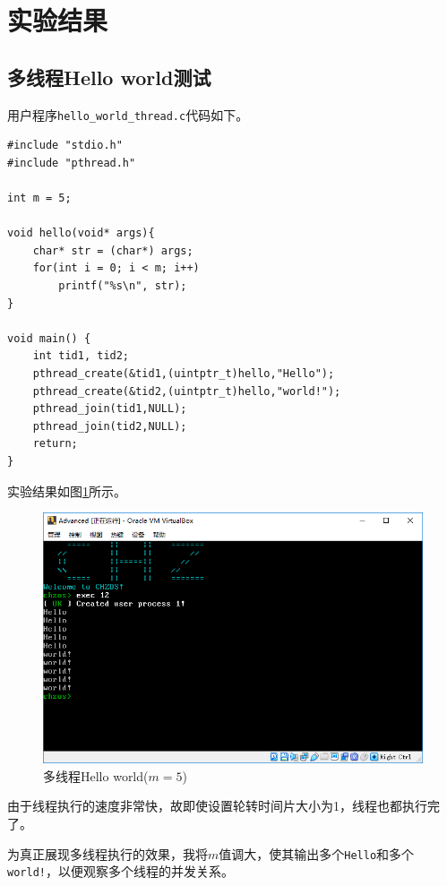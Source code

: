 \documentclass[logo,reportComp]{thesis}
\begin{document}
\section{实验结果}
\subsection{多线程Hello world测试}
用户程序\verb'hello_world_thread.c'代码如下。
\begin{lstlisting}
#include "stdio.h"
#include "pthread.h"

int m = 5;

void hello(void* args){
	char* str = (char*) args;
	for(int i = 0; i < m; i++)
		printf("%s\n", str);
}

void main() {
	int tid1, tid2;
	pthread_create(&tid1,(uintptr_t)hello,"Hello");
	pthread_create(&tid2,(uintptr_t)hello,"world!");
	pthread_join(tid1,NULL);
	pthread_join(tid2,NULL);
	return;
}
\end{lstlisting}

实验结果如图\ref{fig:hello_world}所示。
\begin{figure}[H]
\centering
\includegraphics[width=0.8\linewidth]{fig/hello_world.PNG}
\caption{多线程Hello world($m=5$)}
\label{fig:hello_world}
\end{figure}
由于线程执行的速度非常快，故即使设置轮转时间片大小为1，线程也都执行完了。

为真正展现多线程执行的效果，我将$m$值调大，使其输出多个\verb'Hello'和多个\verb'world!'，以便观察多个线程的并发关系。
\end{document}
